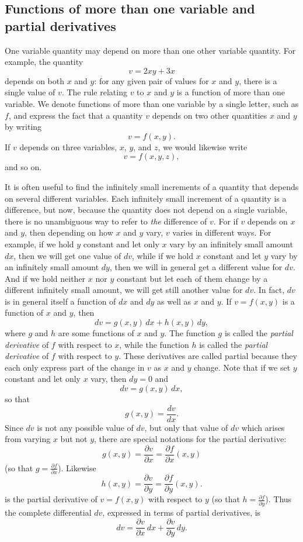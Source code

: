 \documentclass[twoside,openright]{article}
\begin{document}
\subsection*{Functions of more than one variable and partial derivatives}

One variable quantity may depend on more than one other variable
quantity.  For example, the quantity
$$v = 2xy + 3x$$
depends on both $x$ and $y$: for any given pair of values for $x$ and
$y$, there is a single value of $v$.  The rule relating $v$ to $x$ and
$y$ is a function of more than one variable.  We denote functions of
more than one variable by a single letter, such as $f$, and express
the fact that a quantity $v$ depends on two other quantities $x$ and
$y$ by writing
$$v = f(x,y).$$
If $v$ depends on three variables, $x$, $y$, and $z$, we would
likewise write
$$v = f(x,y,z),$$
and so on.

It is often useful to find the infinitely small increments of a quantity that depends on several different variables.  Each infinitely small increment of a quantity is a difference, but now, because the quantity does not depend on a single variable, there is no unambiguous way to refer to {\em the}
difference of $v$.  For if $v$ depends on $x$ and $y$, then depending
on how $x$ and $y$ vary, $v$ varies in different ways.  For example,
if we hold $y$ constant and let only $x$ vary by an infinitely small
amount $dx$, then we will get one value of $dv$, while if we hold $x$
constant and let $y$ vary by an infinitely small amount $dy$, then we
will in general get a different value for $dv$.  And if we hold
neither $x$ nor $y$ constant but let each of them change by a
different infinitely small amount, we will get still another value for
$dv$.  In fact, $dv$ is in general itself a function of $dx$ and $dy$
as well as $x$ and $y$.  If $v = f(x,y)$ is a function of $x$ and $y$,
then
$$dv = g(x,y)\,dx + h(x,y)\,dy,$$
where $g$ and $h$ are some functions of $x$ and $y$.  The function $g$
is called the {\em partial derivative} of $f$ with respect to $x$,
while the function $h$ is called the {\em partial derivative} of $f$
with respect to $y$.  These derivatives are called partial because they each only express part of the change in $v$ as $x$ and $y$ change.  Note that if we set $y$ constant and let only
$x$ vary, then $dy =0$ and
$$dv = g(x,y)\,dx,$$
so that 
$$g(x,y) = \frac{dv}{dx}.$$
Since $dv$ is not any possible value of $dv$, but only that value of
$dv$ which arises from varying $x$ but not $y$, there are special
notations for the partial derivative:
$$g(x,y) = \frac{\partial v}{\partial x} = \frac{\partial f}{\partial x}(x,y)$$
(so that  $\displaystyle g = \frac{\partial f}{\partial x}$).
Likewise
$$h(x,y) = \frac{\partial v}{\partial y}= \frac{\partial f}{\partial y}(x,y).$$
is the partial derivative of $v = f(x,y)$ with respect to $y$ (so that
$\displaystyle h = \frac{\partial f}{\partial y}$).  Thus the complete
differential $dv$, expressed in terms of partial derivatives, is
$$dv =  \frac{\partial v}{\partial x} \,dx +  \frac{\partial v}{\partial y} \,dy.$$
\end{document}
